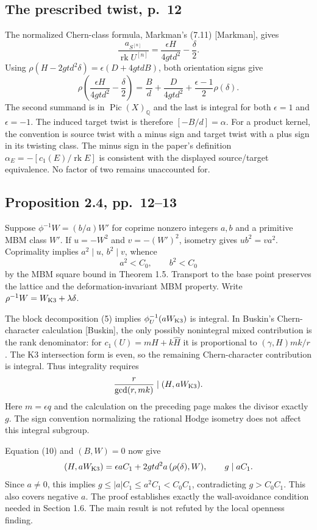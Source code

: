 \documentclass[10pt]{article}
\begin{document}
\subsection*{The prescribed twist, p. 12}
The normalized Chern-class formula, Markman’s (7.11) [Markman], gives \[\frac{a_{S^{[n]}}}{\operatorname{rk}U^{[n]}}
       =\frac{\epsilon H}{4gtd^2}-\frac\delta2 .\] Using \(\rho(H-2gtd^2\delta)=\epsilon(D+4gtdB)\), both orientation signs give \[\rho\left(\frac{\epsilon H}{4gtd^2}-\frac\delta2\right)
   =\frac Bd+\frac{D}{4gtd^2}
      +\frac{\epsilon-1}{2}\rho(\delta).\] The second summand is in \(\operatorname{Pic}(X)_\mathbb Q\) and the last is integral for both \(\epsilon=1\) and \(\epsilon=-1\). The induced target twist is therefore \([-B/d]=\alpha\). For a product kernel, the convention is source twist with a minus sign and target twist with a plus sign in its twisting class. The minus sign in the paper’s definition \(\alpha_E=-[c_1(E)/\operatorname{rk}E]\) is consistent with the displayed source/target equivalence. No factor of two remains unaccounted for.\par
\subsection*{Proposition 2.4, pp. 12–13}
Suppose \(\phi^{-1}W=(b/a)W'\) for coprime nonzero integers \(a,b\) and a primitive MBM class \(W'\). If \(u=-W^2\) and \(v=-(W')^2\), isometry gives \(ub^2=va^2\). Coprimality implies \(a^2\mid u\), \(b^2\mid v\), whence \[a^2<C_0,\qquad b^2<C_0\] by the MBM square bound in Theorem 1.5. Transport to the base point preserves the lattice and the deformation-invariant MBM property. Write \(\rho^{-1}W=W_{\rm K3}+\lambda\delta\).\par
The block decomposition (5) implies \(\phi_U^{-1}(aW_{\rm K3})\) is integral. In Buskin’s Chern-character calculation [Buskin], the only possibly nonintegral mixed contribution is the rank denominator: for \(c_1(U)=mH+k\widehat H\) it is proportional to \((\gamma,H)mk/r\). The K3 intersection form is even, so the remaining Chern-character contribution is integral. Thus integrality requires \[\frac r{\gcd(r,mk)}\mid (H,aW_{\rm K3}).\] Here \(m=\epsilon q\) and the calculation on the preceding page makes the divisor exactly \(g\). The sign convention normalizing the rational Hodge isometry does not affect this integral subgroup.\par
Equation (10) and \((B,W)=0\) now give \[(H,aW_{\rm K3})=\epsilon aC_1+
     2gtd^2a\,(\rho(\delta),W),
 \qquad g\mid aC_1.\] Since \(a\ne0\), this implies \(g\le |a|C_1\le a^2C_1<C_0C_1\), contradicting \(g>C_0C_1\). This also covers negative \(a\). The proof establishes exactly the wall-avoidance condition needed in Section 1.6. The main result is not refuted by the local openness finding.\par
\end{document}
